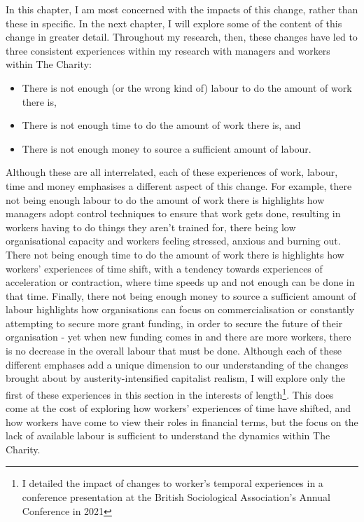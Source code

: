 In this chapter, I am most concerned with the impacts of this change, rather than these in specific. In the next chapter, I will explore some of the content of this change in greater detail. Throughout my research, then, these changes have led to three consistent experiences within my research with managers and workers within The Charity: 
\begin{itemize}
\item There is not enough (or the wrong kind of) labour to do the amount of work there is,
\item There is not enough time to do the amount of work there is, and
\item There is not enough money to source a sufficient amount of labour. 
\end{itemize}
Although these are all interrelated, each of these experiences of work, labour, time and money emphasises a different aspect of this change. For example, there not being enough labour to do the amount of work there is highlights how managers adopt control techniques to ensure that work gets done, resulting in workers having to do things they aren’t trained for, there being low organisational capacity and workers feeling stressed, anxious and burning out. There not being enough time to do the amount of work there is highlights how workers’ experiences of time shift, with a tendency towards experiences of acceleration or contraction, where time speeds up and not enough can be done in that time. Finally, there not being enough money to source a sufficient amount of labour highlights how organisations can focus on commercialisation or constantly attempting to secure more grant funding, in order to secure the future of their organisation - yet when new funding comes in and there are more workers, there is no decrease in the overall labour that must be done. Although each of these different emphases add a unique dimension to our understanding of the changes brought about by austerity-intensified capitalist realism, I will explore only the first of these experiences in this section in the interests of length\footnote{I detailed the impact of changes to worker's temporal experiences in a conference presentation at the British Sociological Association's Annual Conference in 2021}. This does come at the cost of exploring how workers' experiences of time have shifted, and how workers have come to view their roles in financial terms, but the focus on the lack of available labour is sufficient to understand the dynamics within The Charity. 
 
